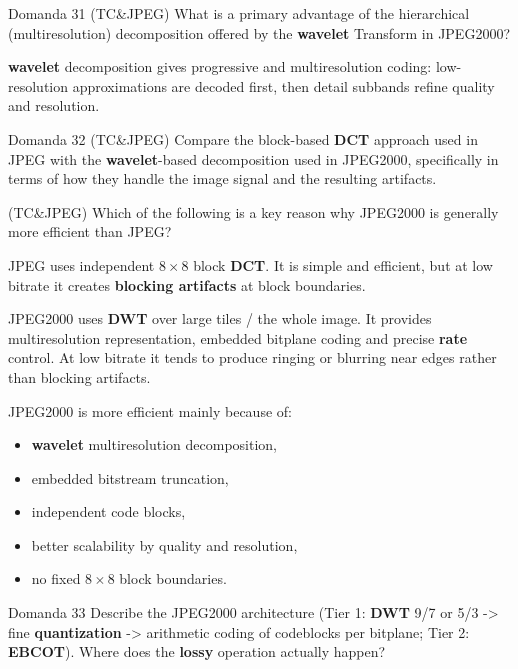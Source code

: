 \begin{questionbox}{Domanda 31}
(TC\&JPEG) What is a primary advantage of the hierarchical (multiresolution) decomposition offered by the \textbf{wavelet} Transform in JPEG2000?
\end{questionbox}


\textbf{wavelet} decomposition gives progressive and multiresolution coding: low-resolution approximations are decoded first, then detail subbands refine quality and resolution.



\begin{questionbox}{Domanda 32}
(TC\&JPEG) Compare the block-based \textbf{DCT} approach used in JPEG with the \textbf{wavelet}-based decomposition used in JPEG2000, specifically in terms of how they handle the image signal and the resulting artifacts.

(TC\&JPEG) Which of the following is a key reason why JPEG2000 is generally more efficient than JPEG?
\end{questionbox}


JPEG uses independent $8\times 8$ block \textbf{DCT}. It is simple and efficient, but at low bitrate it creates \textbf{blocking artifacts} at block boundaries.

JPEG2000 uses \textbf{DWT} over large tiles / the whole image. It provides multiresolution representation, embedded bitplane coding and precise \textbf{rate} control. At low bitrate it tends to produce ringing or blurring near edges rather than blocking artifacts.

JPEG2000 is more efficient mainly because of:

\begin{itemize}
  \item \textbf{wavelet} multiresolution decomposition,
  \item embedded bitstream truncation,
  \item independent code blocks,
  \item better scalability by quality and resolution,
  \item no fixed $8\times 8$ block boundaries.
\end{itemize}



\begin{questionbox}{Domanda 33}
Describe the JPEG2000 architecture (Tier 1: \textbf{DWT} 9/7 or 5/3 -> fine \textbf{quantization} -> arithmetic coding of codeblocks per bitplane; Tier 2: \textbf{EBCOT}). Where does the \textbf{lossy} operation actually happen?
\end{questionbox}



